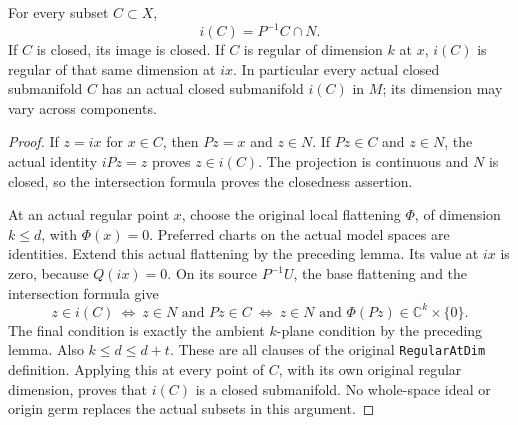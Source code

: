 \begin{lemma}
\label{hir:actual-zero-section-image-closed-submanifold}
\leanok
For every subset $C\subset X$,
\[
 i(C)=P^{-1}C\cap N.
\]
If $C$ is closed, its image is closed. If $C$ is regular of dimension
$k$ at $x$, $i(C)$ is regular of that same dimension at $ix$.
In particular every actual closed submanifold $C$ has an actual closed
submanifold $i(C)$ in $M$; its dimension may vary across components.
\end{lemma}
\begin{proof}
If $z=ix$ for $x\in C$, then $Pz=x$ and $z\in N$. If $Pz\in C$ and
$z\in N$, the actual identity $iPz=z$ proves $z\in i(C)$.
The projection is continuous and $N$ is closed, so the intersection
formula proves the closedness assertion.

At an actual regular point $x$, choose the original local flattening
$\Phi$, of dimension $k\leq d$, with $\Phi(x)=0$. Preferred charts on
the actual model spaces are identities. Extend this actual flattening
by the preceding lemma. Its value at $ix$ is zero, because $Q(ix)=0$.
On its source $P^{-1}U$, the base flattening and the intersection formula
give
\[
 z\in i(C)\ \Longleftrightarrow\ z\in N\text{ and }Pz\in C
 \ \Longleftrightarrow\ z\in N\text{ and }\Phi(Pz)\in\mathbb C^k\times\{0\}.
\]
The final condition is exactly the ambient $k$-plane condition by the
preceding lemma. Also $k\leq d\leq d+t$. These are all clauses of the
original \texttt{RegularAtDim} definition. Applying this at every point
of $C$, with its own original regular dimension, proves that $i(C)$ is
a closed submanifold. No whole-space ideal or origin germ replaces the
actual subsets in this argument.
\end{proof}


